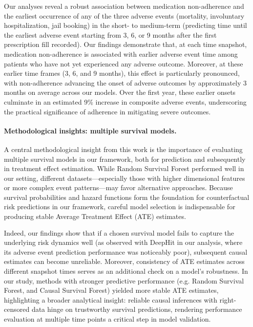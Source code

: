 Our analyses reveal a robust association between medication non-adherence and the earliest occurrence of any of the three adverse events (mortality, involuntary hospitalization, jail booking) in the short- to medium-term (predicting time until the earliest adverse event starting from 3, 6, or 9 months after the first prescription fill recorded).
Our findings demonstrate that, at each time snapshot, medication non-adherence is associated with earlier adverse event time among patients who have not yet experienced any adverse outcome.
Moreover, at these earlier time frames (3, 6, and 9 months), this effect is particularly pronounced, with non-adherence advancing the onset of adverse outcomes by approximately 3 months on average across our models.
Over the first year, these earlier onsets culminate in an estimated 9\% increase in composite adverse events, underscoring the practical significance of adherence in mitigating severe outcomes.

\vspace{-.25em}
\paragraph{Methodological insights: multiple survival models.}
A central methodological insight from this work is the importance of evaluating multiple survival models in our framework, both for prediction and subsequently in treatment effect estimation.
While Random Survival Forest performed well in our setting, different datasets---especially those with higher dimensional features or more complex event patterns---may favor alternative approaches.
Because survival probabilities and hazard functions form the foundation for counterfactual risk predictions in our framework, careful model selection is indispensable for producing stable Average Treatment Effect (ATE) estimates.

Indeed, our findings show that if a chosen survival model fails to capture the underlying risk dynamics well (as observed with DeepHit in our analysis, where its adverse event prediction performance was noticeably poor), subsequent causal estimates can become unreliable.
Moreover, consistency of ATE estimates across different snapshot times serves as an additional check on a model’s robustness.
In our study, methods with stronger predictive performance (e.g. Random Survival Forest, and Causal Survival Forest) yielded more stable ATE estimates, highlighting a broader analytical insight: reliable causal inferences with right-censored data hinge on trustworthy survival predictions, rendering performance evaluation at multiple time points a critical step in model validation.

